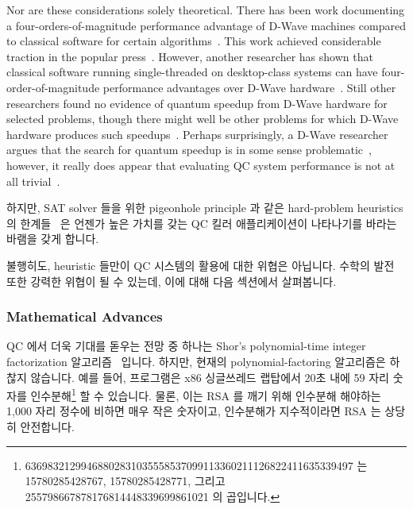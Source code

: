 Nor are these considerations solely theoretical.
There has been work documenting a four-orders-of-magnitude
performance advantage of D-Wave machines compared to classical
software for certain algorithms~\cite{McGeoch:2013:EEA:2482767.2482797}.
This work achieved considerable traction in the popular
press~\cite{CharlesChoi2013D-WaveGoogleNASA}.
However, another researcher has shown that classical software running
single-threaded on desktop-class systems can
have four-order-of-magnitude performance advantages over
D-Wave hardware~\cite{AlexSelby2014D-Wave-vs-classical,AlexSelby2013D-WaveHarderQUBO}.
Still other researchers found no evidence of quantum speedup
from D-Wave hardware for selected problems, though there might well be
other problems for which D-Wave hardware produces such
speedups~\cite{AdrianCho2014QC-D-WaveNoSpeedup,TroelsFRonnow2014QC-D-WaveNoSpeedup}.
Perhaps surprisingly, a D-Wave researcher argues that the search for
quantum speedup is in some sense
problematic~\cite{MohammadHAmin2015QC-D-Wave-QuantumSpeedupProblematic},
however, it really does appear that evaluating QC system performance is
not at all
trivial~\cite{PhysRevLett.118.100601,ArsTechnica2017QC-SpeedTradeoffs}.
\fi

하지만, SAT solver 들을 위한 pigeonhole principle 과 같은 hard-problem
heuristics 의 한계들~\cite[page~38]{Kroening:2008:DPA:1391237} 은 언젠가 높은
가치를 갖는 QC 킬러 애플리케이션이 나타나기를 바라는 바램을 갖게 합니다.

불행히도, heuristic 들만이 QC 시스템의 활용에 대한 위협은 아닙니다.
수학의 발전 또한 강력한 위협이 될 수 있는데, 이에 대해 다음 섹션에서
살펴봅니다.

\subsubsection{Mathematical Advances}
\label{sec:future:Mathematical Advances}

QC 에서 더욱 기대를 돋우는 전망 중 하나는 Shor's polynomial-time integer
factorization
알고리즘~\cite{Shor:1997:PAP:264393.264406,WikipediaShorsAlgorithm} 입니다.
하지만, 현재의 polynomial-factoring 알고리즘은 하찮지 않습니다.
예를 들어,  프로그램은 x86 싱글쓰레드 랩탑에서 20초 내에 59 자리
숫자를 인수분해\footnote{
	\scriptsize
	63698321299468802831035558537099113360211126822411635339497 는
	15780285428767, 15780285428771, 그리고
	255798667878176814448339699861021 의 곱입니다.}
할 수 있습니다.
물론, 이는 RSA 를 깨기 위해 인수분해 해야하는 1,000 자리 정수에 비하면 매우
작은 숫자이고, 인수분해가 지수적이라면 RSA 는 상당히 안전합니다.
\iffalse


